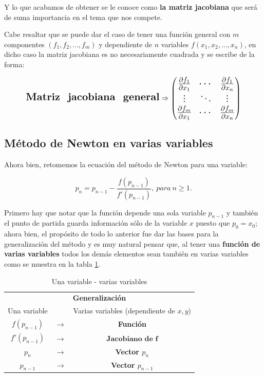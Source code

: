 Y lo que acabamos de obtener se le conoce como \textbf{la matriz jacobiana} que será de suma importancia en el tema que nos compete.

Cabe resaltar que se puede dar el caso de tener una función general con $m$ componentes $(f_1,f_2,\dotso,f_m)$ y dependiente de $n$ variables $f(x_1,x_2,\dotso,x_n)$, en dicho caso la matriz jacobiana es no necesariamente cuadrada y se escribe de la forma:

\begin{equation*}
\Large
\textbf{Matriz \ jacobiana \ general}\Rightarrow 
\begin{pmatrix}
\frac{\partial f_1}{\partial x_1} & \dotsb & \frac{\partial f_1}{\partial x_n}\\
\vdots & \ddots & \vdots\\
\frac{\partial f_m}{\partial x_1} & \dotsb & \frac{\partial f_m}{\partial x_n}
\end{pmatrix}
\end{equation*} 


\subsection*{Método de Newton en varias variables}
Ahora bien, retomemos la ecuación del método de Newton para una variable:

\begin{equation*}
    p_n= p_{n-1} -\frac{f(p_{n-1})}{f'(p_{n-1})}, \ para \ n\geq 1.
\end{equation*}

Primero hay que notar que la función depende una sola variable $p_{n-1}$ y también el punto de partida guarda información sólo de la variable $x$ puesto que $p_0=x_0$; ahora bien, el propósito de todo lo anterior fue dar las bases para la generalización del método y es muy natural pensar que, al tener una \textbf{función de varias variables} todos los demás elementos sean también en varias variables como se muestra en la tabla \ref{tab:tabla7}.

\begin{table}[h!]
\centering
    \begin{tabular}{||c c c||}
    \hline 
    \hline
        \multicolumn{3}{c}{\textbf{Generalización}}\tabularnewline
        Una variable &  & Varias variables (dependiente de $x,y$) \\
    \hline 
    \hline 
        $f(p_{n-1})$ & $\rightarrow$ & \textbf{Función} \\
        $f'(p_{n-1})$ & $\rightarrow$ & $\textbf{Jacobiano de f}$ \\
        $p_n$  & $\rightarrow$ & \textbf{Vector $p_n$} \\
        $p_{n-1}$ & $\rightarrow$ & \textbf{Vector $p_{n-1}$} \\
        \hline
        \hline 
    \end{tabular}
\caption{Una variable - varias variables}
\label{tab:tabla7} 
\end{table}

